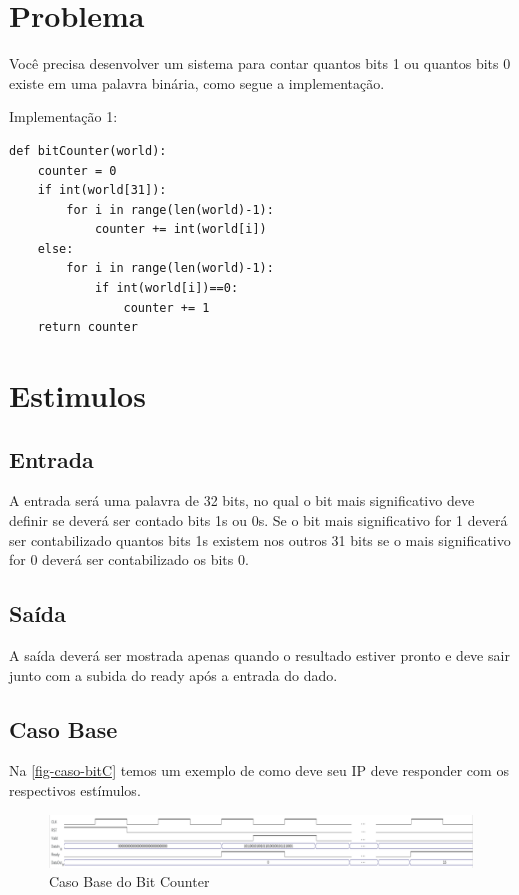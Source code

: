\documentclass[
    12pt,
    a4paper,
    oneside,
    chapter=TITLE,
    section=TITLE,
    subsection=TITLE,
    subsubsection=TITLE,
    english,
    french,
    spanish,
    brazil,
    ]{abntex2}
\begin{document}
\frenchspacing 
\imprimircapa
\imprimirfolhaderosto

\tableofcontents*
\cleardoublepage

\textual

\chapter{Problema}
Você precisa desenvolver um sistema para contar quantos bits 1 ou quantos bits 0 existe em uma palavra binária, como segue a implementação.

\par
Implementação 1:
\begin{lstlisting}
def bitCounter(world):
    counter = 0
    if int(world[31]):
        for i in range(len(world)-1):
            counter += int(world[i])
    else:
        for i in range(len(world)-1):
            if int(world[i])==0:
                counter += 1
    return counter
\end{lstlisting}



\chapter{Estimulos}
\section{Entrada}
A entrada será uma palavra de 32 bits, no qual o bit mais significativo deve definir se deverá ser contado bits 1s ou 0s. Se o bit mais significativo for 1 deverá ser contabilizado quantos bits 1s existem nos outros 31 bits se o mais significativo for 0 deverá ser contabilizado os bits 0.

\section{Saída}
A saída deverá ser mostrada apenas quando o resultado estiver pronto e deve sair junto com a subida do ready após a entrada do dado.

\section{Caso Base}
Na \autoref{fig-caso-bitC} temos um exemplo de como deve seu IP deve responder com os respectivos estímulos.

\begin{figure}[htb]
    \caption{\label{fig-caso-bitC}Caso Base do Bit Counter}
    \begin{center}
        \advance\leftskip-3cm
        \includegraphics[width=\paperwidth]{imgs/caso-bitC.png}
    \end{center}
\end{figure}
\end{document}
